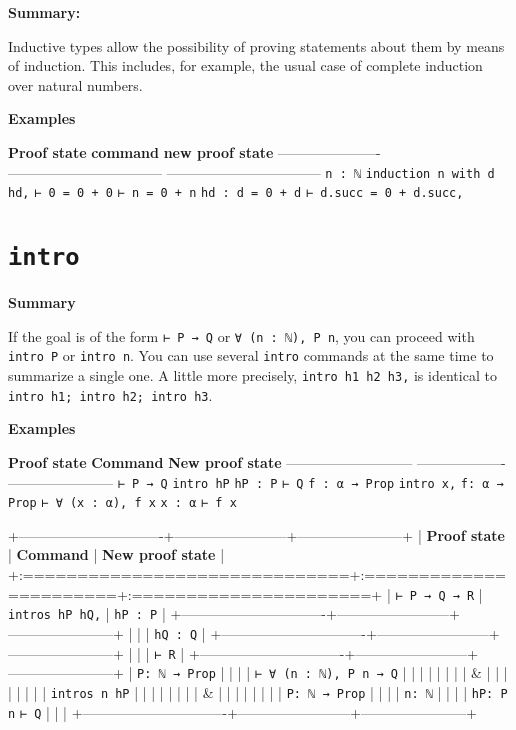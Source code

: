 \documentclass{memoir}
\begin{document}
\textbf{Summary:}

Inductive types allow the possibility of proving statements about them by means of induction. This includes, for example, the usual case of complete induction over natural numbers.

\textbf{Examples}

\textbf{Proof state} \textbf{command} \textbf{new proof state}
---------------------- --------------------------------- ---------------------------------
\Verb|n : ℕ| \Verb|induction n with d hd,| \Verb|⊢ 0 = 0 + 0|
\Verb|⊢ n = 0 + n| \Verb|hd : d = 0 + d|
\Verb|⊢ d.succ = 0 + d.succ,|




\section{\Verb|intro|}

\textbf{Summary}

If the goal is of the form \Verb|⊢ P → Q| or \Verb|∀ (n : ℕ), P n|, you can proceed with \Verb|intro P| or \Verb|intro n|. You can use several \Verb|intro| commands at the same time to summarize a single one. A little more precisely, \Verb|intro h1 h2 h3,| is identical to \Verb|intro h1; intro h2; intro h3|.

\textbf{Examples}

\textbf{Proof state} \textbf{Command} \textbf{New proof state}
--------------------------- ------------------- -----------------------
\Verb|⊢ P → Q| \Verb|intro hP| \Verb|hP : P|
\Verb|⊢ Q|
\Verb|f : α → Prop| \Verb|intro x,| \Verb|f: α → Prop|
\Verb|⊢ ∀ (x : α), f x| \Verb|x : α|
\Verb|⊢ f x|

+-------------------------------+------------------------+-----------------------+
| \textbf{Proof state} | \textbf{Command} | \textbf{New proof state} |
+:==============================+:=======================+:======================+
| \Verb|⊢ P → Q → R| | \Verb|intros hP hQ,| | \Verb|hP : P| |
+-------------------------------+------------------------+-----------------------+
| | | \Verb|hQ : Q| |
+-------------------------------+------------------------+-----------------------+
| | | \Verb|⊢ R| |
+-------------------------------+------------------------+-----------------------+
| \Verb|P: ℕ → Prop| | | |
| \Verb|⊢ ∀ (n : ℕ), P n → Q| | | |
| | | |
| & | | |
| | | |
| \Verb|intros n hP| | | |
| | | |
| & | | |
| | | |
| \Verb|P: ℕ → Prop| | | |
| \Verb|n: ℕ| | | |
| \Verb|hP: P n| \Verb|⊢ Q| | | |
+-------------------------------+------------------------+-----------------------+
\end{document}
